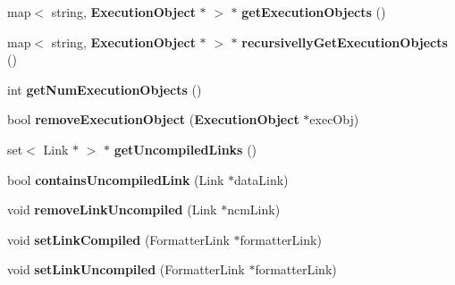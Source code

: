 \begin{CompactItemize}
\item 
map$<$ string, {\bf ExecutionObject} $\ast$ $>$ $\ast$ \textbf{getExecutionObjects} ()\label{classbr_1_1pucrio_1_1telemidia_1_1ginga_1_1ncl_1_1model_1_1components_1_1CompositeExecutionObject_a1826cd6008f8f2498ec2b8fb0f92af1}

\item 
map$<$ string, {\bf ExecutionObject} $\ast$ $>$ $\ast$ \textbf{recursivellyGetExecutionObjects} ()\label{classbr_1_1pucrio_1_1telemidia_1_1ginga_1_1ncl_1_1model_1_1components_1_1CompositeExecutionObject_f514aa14542e938b3e5fc14082d89b2d}

\item 
int \textbf{getNumExecutionObjects} ()\label{classbr_1_1pucrio_1_1telemidia_1_1ginga_1_1ncl_1_1model_1_1components_1_1CompositeExecutionObject_49c5f99a22e49c5c5f2a426fadea837d}

\item 
bool \textbf{removeExecutionObject} ({\bf ExecutionObject} $\ast$execObj)\label{classbr_1_1pucrio_1_1telemidia_1_1ginga_1_1ncl_1_1model_1_1components_1_1CompositeExecutionObject_d033f20c8aa93f28d3ee9ef336f25d38}

\item 
set$<$ Link $\ast$ $>$ $\ast$ \textbf{getUncompiledLinks} ()\label{classbr_1_1pucrio_1_1telemidia_1_1ginga_1_1ncl_1_1model_1_1components_1_1CompositeExecutionObject_ecb64c5c246bfcbea637a91230c6c564}

\item 
bool \textbf{containsUncompiledLink} (Link $\ast$dataLink)\label{classbr_1_1pucrio_1_1telemidia_1_1ginga_1_1ncl_1_1model_1_1components_1_1CompositeExecutionObject_3054bea2954dcfbcc25718f8ebe48e0b}

\item 
void \textbf{removeLinkUncompiled} (Link $\ast$ncmLink)\label{classbr_1_1pucrio_1_1telemidia_1_1ginga_1_1ncl_1_1model_1_1components_1_1CompositeExecutionObject_6f7849eb893394b96f9745b6e6f564f9}

\item 
void \textbf{setLinkCompiled} (FormatterLink $\ast$formatterLink)\label{classbr_1_1pucrio_1_1telemidia_1_1ginga_1_1ncl_1_1model_1_1components_1_1CompositeExecutionObject_4b44e0f61da331984a8b381c9100b44c}

\item 
void \textbf{setLinkUncompiled} (FormatterLink $\ast$formatterLink)\label{classbr_1_1pucrio_1_1telemidia_1_1ginga_1_1ncl_1_1model_1_1components_1_1CompositeExecutionObject_9d0085df39c388490a53cba1bf1a864f}


\end{CompactItemize}
